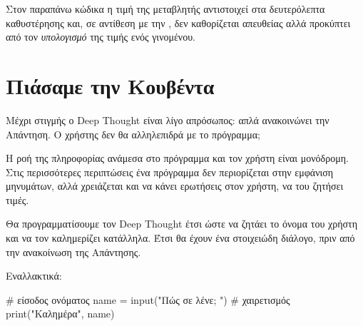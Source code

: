 \documentclass[a4paper,11pt,oneside]{book}
\begin{document}
Στον παραπάνω κώδικα η τιμή της μεταβλητής  αντιστοιχεί στα δευτερόλεπτα καθυστέρησης και, σε αντίθεση με την , δεν καθορίζεται απευθείας αλλά προκύπτει από τον \emph{υπολογισμό} της τιμής ενός γινομένου. 


\section{Πιάσαμε την Κουβέντα}

\begin{question}
Μέχρι στιγμής ο Deep Thought είναι λίγο απρόσωπος: απλά ανακοινώνει την Απάντηση. Ο χρήστης δεν θα αλληλεπιδρά με το πρόγραμμα;
\end{question}

Η ροή της πληροφορίας ανάμεσα στο πρόγραμμα και τον χρήστη είναι μονόδρομη. Στις περισσότερες περιπτώσεις ένα πρόγραμμα δεν περιορίζεται στην εμφάνιση μηνυμάτων, αλλά χρειάζεται και να κάνει ερωτήσεις στον χρήστη, να του ζητήσει τιμές.

Θα προγραμματίσουμε τον Deep Thought έτσι ώστε να ζητάει το όνομα του χρήστη και να τον καλημερίζει κατάλληλα. Έτσι θα έχουν ένα στοιχειώδη διάλογο, πριν από την ανακοίνωση της Απάντησης.



Εναλλακτικά:

%
\begin{pycode}
# είσοδος ονόματος
name = input("Πώς σε λένε; ")
# χαιρετισμός
print("Καλημέρα", name)
\end{pycode}
\end{document}
